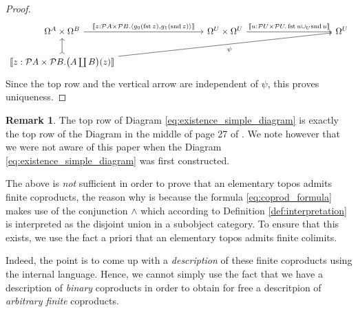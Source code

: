 \documentclass{birkjour}
\theoremstyle{plain}
\theoremstyle{definition}
\newtheorem{remark}[thm]{Remark}
\newcommand{\call}[1]{\mathcal{#1}}
\begin{document}
\begin{proof}
\begin{equation}
{				\begin{tikzcd}[column sep = huge]
					\Omega^A \times \Omega^B\arrow[rr, "{\llbracket z: \call{P}A \times \call{P}B.  \langle g_0(\operatorname{fst}z),g_1(\operatorname{snd}z)\rangle\rrbracket}"] & & \Omega^U \times \Omega^U\arrow[rr,"{\llbracket u: \call{P}U \times \call{P}U . \operatorname{fst}u \cup_U \operatorname{snd}u \rrbracket}"] & & \Omega^U\\
					\llbracket z: \call{P}A \times \call{P}B. \big(A \coprod B\big)(z) \rrbracket\arrow[u,rightarrowtail]\arrow[rrrru,swap,"{\psi}"]
			\end{tikzcd}}
		\end{equation}
		Since the top row and the vertical arrow are independent of $\psi$, this proves uniqueness.
	\end{proof}
	\begin{remark}
		The top row of Diagram \eqref{eq:existence_simple_diagram} is exactly the top row of the Diagram in the middle of page 27 of \cite{Mikkelson}. We note however that we were not aware of this paper when the Diagram \eqref{eq:existence_simple_diagram} was first constructed.
	\end{remark}
	The above is \emph{not} sufficient in order to prove that an elementary topos admits finite coproducts, the reason why is because the formula \eqref{eq:coprod_formula} makes use of the conjunction $\wedge$ which according to Definition \ref{def:interpretation} is interpreted as the disjoint union in a subobject category. To ensure that this exists, we use the fact a priori that an elementary topos admits finite colimits.
	
	Indeed, the point is to come up with a \emph{description} of these finite coproducts using the internal language. Hence, we cannot simply use the fact that we have a description of \emph{binary} coproducts in order to obtain for free a descritpion of \emph{arbitrary finite} coproducts.
	
\end{document}
